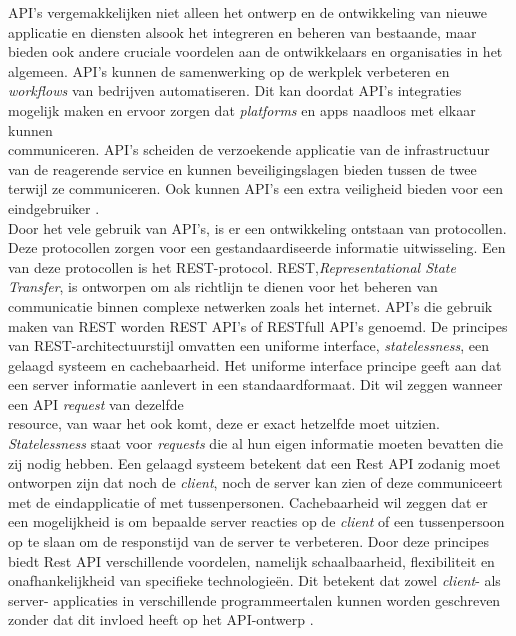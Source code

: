 API’s vergemakkelijken niet alleen het ontwerp en de ontwikkeling van nieuwe \\applicatie en diensten alsook het integreren en beheren van bestaande, maar \\bieden ook andere cruciale voordelen aan de ontwikkelaars en organisaties in het \\algemeen. API’s kunnen de samenwerking op de werkplek verbeteren en \\ \textit{workflows} van bedrijven automatiseren. Dit kan doordat API’s integraties mogelijk maken en ervoor zorgen dat \textit{platforms} en apps naadloos met elkaar kunnen \\communiceren. API’s scheiden de verzoekende applicatie van de infrastructuur van de reagerende service en kunnen beveiligingslagen bieden tussen de twee terwijl ze communiceren. Ook kunnen API’s een extra veiligheid bieden voor een eindgebruiker \autocite{IBMa}.  \\

Door het vele gebruik van API’s, is er een ontwikkeling ontstaan van protocollen. Deze protocollen zorgen voor een gestandaardiseerde informatie uitwisseling. Een van deze protocollen is het REST-protocol. REST,\textit{Representational State Transfer}, is ontworpen om als richtlijn te dienen voor het beheren van communicatie binnen complexe netwerken zoals het internet. API’s die gebruik maken van REST worden REST API’s of RESTfull API’s genoemd. De principes van REST-architectuurstijl omvatten een uniforme interface, \textit{statelessness}, een gelaagd systeem en cachebaarheid. Het uniforme interface principe geeft aan dat een server informatie aanlevert in een standaardformaat. Dit wil zeggen wanneer een API \textit{request} van dezelfde \\resource, van waar het ook komt, deze er exact hetzelfde moet uitzien. \textit{Statelessness} staat voor \textit{requests} die al hun eigen informatie moeten bevatten die zij nodig hebben. Een gelaagd systeem betekent dat een Rest API zodanig moet \\ontworpen zijn dat noch de \textit{client}, noch de server kan zien of deze communiceert met de eindapplicatie of met  tussenpersonen. Cachebaarheid wil zeggen dat er een mogelijkheid is om bepaalde server reacties op de \textit{client} of een tussenpersoon op te slaan om de responstijd van de server te verbeteren. Door deze principes biedt Rest API verschillende voordelen, namelijk schaalbaarheid, flexibiliteit en onafhankelijkheid van specifieke technologieën. Dit betekent dat zowel \textit{client}- als server- applicaties in verschillende programmeertalen kunnen worden geschreven zonder dat dit invloed heeft op het API-ontwerp \autocite{IBM}.  \\

